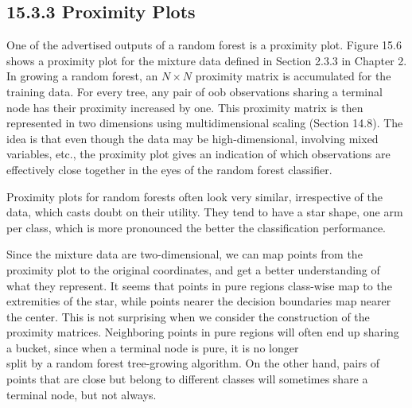 \documentclass[10pt]{article}
\begin{document}
\subsection*{15.3.3 Proximity Plots}
One of the advertised outputs of a random forest is a proximity plot. Figure 15.6 shows a proximity plot for the mixture data defined in Section 2.3.3 in Chapter 2. In growing a random forest, an $N \times N$ proximity matrix is accumulated for the training data. For every tree, any pair of oob observations sharing a terminal node has their proximity increased by one. This proximity matrix is then represented in two dimensions using multidimensional scaling (Section 14.8). The idea is that even though the data may be high-dimensional, involving mixed variables, etc., the proximity plot gives an indication of which observations are effectively close together in the eyes of the random forest classifier.

Proximity plots for random forests often look very similar, irrespective of the data, which casts doubt on their utility. They tend to have a star shape, one arm per class, which is more pronounced the better the classification performance.

Since the mixture data are two-dimensional, we can map points from the proximity plot to the original coordinates, and get a better understanding of what they represent. It seems that points in pure regions class-wise map to the extremities of the star, while points nearer the decision boundaries map nearer the center. This is not surprising when we consider the construction of the proximity matrices. Neighboring points in pure regions will often end up sharing a bucket, since when a terminal node is pure, it is no longer\\
split by a random forest tree-growing algorithm. On the other hand, pairs of points that are close but belong to different classes will sometimes share a terminal node, but not always.
\end{document}
